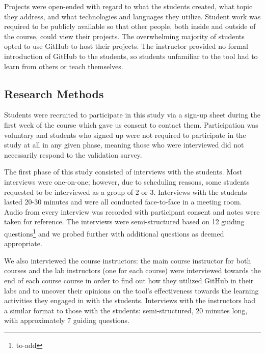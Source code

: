 Projects were open-ended with regard to what the students created, what topic they address, and what technologies and languages they utilize. Student work was required to be publicly available so that other people, both inside and outside of the course, could view their projects. The overwhelming majority of students opted to use GitHub to host their projects. The instructor provided no formal introduction of GitHub to the students, so students unfamiliar to the tool had to learn from others or teach themselves. %

\subsection{Research Methods}
Students were recruited to participate in this study via a sign-up sheet during the first week of the course which gave us consent to contact them. Participation was voluntary and students who signed up were not required to participate in the study at all in any given phase, meaning those who were interviewed did not necessarily respond to the validation survey.

The first phase of this study consisted of interviews with the students. Most interviews were one-on-one; however, due to scheduling reasons, some students requested to be interviewed as a group of 2 or 3. Interviews with the students lasted 20-30 minutes and were all conducted face-to-face in a meeting room. Audio from every interview was recorded with participant consent and notes were taken for reference. The interviews were semi-structured based on 12 guiding questions\footnote{to-add} and we probed further with additional questions as deemed appropriate. %

We also interviewed the course instructors: the main course instructor for both courses and the lab instructors (one for each course) were interviewed towards the end of each course course in order to find out how they utilized GitHub in their labs and to uncover their opinions on the tool's effectiveness towards the learning activities they engaged in with the students. Interviews with the instructors had a similar format to those with the students: semi-structured, 20 minutes long, with approximately 7 guiding questions.

